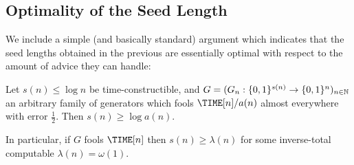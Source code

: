 \subsection{Optimality of the Seed Length}

We include a simple (and basically standard) argument which indicates that the seed lengths obtained in the previous are essentially optimal with respect to the amount of advice they can handle:
\begin{lemma}\label{randomstrings:lem:optimal}
Let $s(n)\leq \log n$ be time-constructible, and $G = (G_n: \{0,1\}^{s(n)} \to \{0,1\}^n)_{n \in \mathbb{N}}$ an arbitrary family of generators which fools $\TIME[n]/a(n)$ almost everywhere with error $\frac{1}{2}$. Then $s(n) \geq \log a(n) $.

In particular, if $G$ fools $\TIME[n]$ then $s(n) \geq \lambda(n)$ for some inverse-total computable $\lambda(n) = \omega(1)$.  
\end{lemma}

